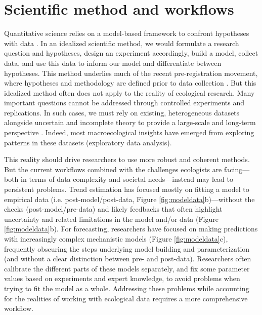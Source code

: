 \documentclass[11pt]{article}
\newcommand{\llabel}[1]{\hypertarget{lintarget:#1}{}\linelabel{lin:#1}}
\begin{document}
\section{Scientific method and workflows}

Quantitative science relies on a model-based framework to confront hypotheses with data \citep{Chamberlin:1965cd}. In an idealized scientific method, we would formulate a research question and hypotheses, design an experiment accordingly, build a model, collect data, and use this data to inform our model and differentiate between hypotheses. This method underlies much of the recent pre-registration movement, where hypotheses and methodology are defined prior to data collection \citep{Nosek2018}.
But this idealized method often does not apply to the reality of ecological research. Many important questions cannot be addressed through controlled experiments and replications. In such cases, we must rely on existing, heterogeneous datasets alongside uncertain and incomplete theory to provide a large-scale and long-term perspective \citep{Hilborn1997}. Indeed, most macroecological insights have emerged from exploring patterns in these datasets (exploratory data analysis).

This reality should drive researchers to use more robust and coherent methods. But the current workflows combined with the challenges ecologists are facing---both in terms of data complexity and societal needs---instead may lead to persistent problems.
Trend estimation has focused mostly on fitting a model to empirical data (\llabel{quad1}i.e. post-model/post-data, Figure \ref{fig:modeldata}b)---without the checks (\llabel{quad2}post-model/pre-data) and likely feedbacks that often highlight uncertainty and related limitations in the model and/or data (Figure \ref{fig:modeldata}b). For forecasting, researchers have focused on making predictions with increasingly complex mechanistic models (Figure \ref{fig:modeldata}c), frequently obscuring the steps underlying model building and parameterization (\llabel{quad3}and without a clear distinction between pre- and post-data). Researchers often calibrate the different parts of these models separately, and fix some parameter values based on experiments and expert knowledge, to avoid problems when trying to fit the model as a whole.
Addressing these problems while accounting for the realities of working with ecological data requires a more comprehensive workflow.
\end{document}
